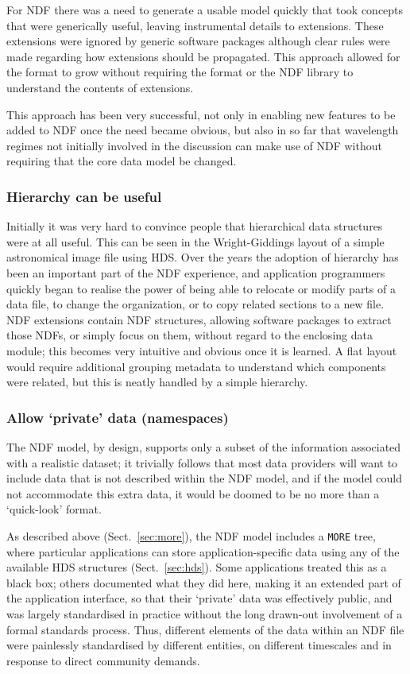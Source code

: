\documentclass[final,authoryear,5p,times,twocolumn]{elsarticle}
\newcommand*\secref[1]{Sect.~\ref{#1}}
\begin{document}
For NDF there was a need to generate a usable model quickly that took
concepts that were generically useful, leaving instrumental details to
extensions. These extensions were ignored by generic software packages
although clear rules were made regarding how extensions should be
propagated. This approach allowed for the format to grow without
requiring the format or the NDF library to understand the
contents of extensions.

This approach has been very successful, not only in enabling new
features to be added to NDF once the need became obvious, but also
in so far that wavelength regimes not initially involved in the
discussion can make use of NDF without requiring that the core data
model be changed.

\subsubsection{Hierarchy can be useful}

Initially it was very hard to convince people that hierarchical data
structures were at all useful. This can be seen in the Wright-Giddings
layout of a simple astronomical image file using HDS. Over the years
the adoption of hierarchy has been an important part of the NDF
experience, and application programmers quickly began to realise the power of
being able to relocate or modify parts of a data file,
to change the organization, or to copy related sections to a new file.
NDF extensions contain NDF structures, allowing
software packages to extract those NDFs, or simply focus on them,
without regard to the enclosing data module; this becomes very intuitive and
obvious once it is learned. A flat layout would require additional
grouping metadata to understand which components were related, but this
is neatly handled by a simple hierarchy.

\subsubsection{Allow `private' data (namespaces)}

The NDF model, by design, supports only a subset of the information
associated with a realistic dataset; it trivially follows that most
data providers will want to include data that is not described within
the NDF model, and if the model could not accommodate this extra data,
it would be doomed to be no more than a `quick-look' format.

As described above (\secref{sec:more}), the NDF model includes a
\texttt{MORE} tree, where particular applications can store
application-specific data using any of the available HDS structures
(\secref{sec:hds}).  Some applications treated this as a black box;
others documented what they did here, making it an extended part of
the application interface, so that their `private' data was effectively
public, and was largely standardised in practice without the long
drawn-out involvement of a formal standards process.  Thus, different
elements of the data within an NDF file were painlessly standardised
by different entities, on different timescales and in response to
direct community demands.
\end{document}

